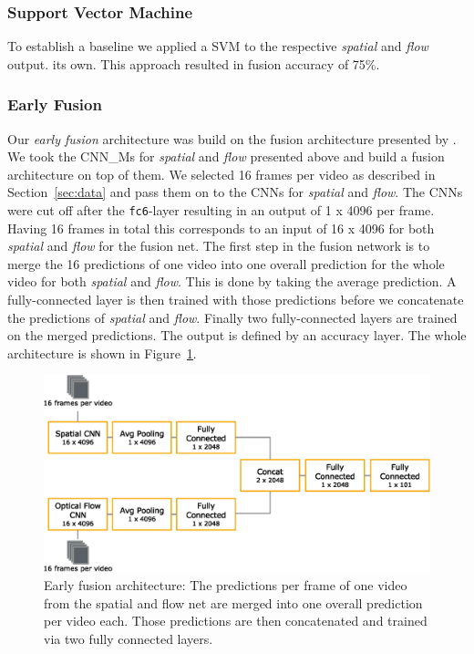 \subsubsection{Support Vector Machine}
To establish a baseline we applied a SVM to the respective \emph{spatial} and \emph{flow} output.
its own.
This approach resulted in fusion accuracy of 75\%.

\subsubsection{Early Fusion}
Our \emph{early fusion} architecture was build on the fusion architecture presented by .
We took the CNN\_Ms for \emph{spatial} and \emph{flow} presented above and build a fusion architecture on top of them.
We selected 16 frames per video as described in Section~\ref{sec:data} and pass them on to the CNNs for \emph{spatial} and \emph{flow}.
The CNNs were cut off after the \texttt{fc6}-layer resulting in an output of 1 x 4096 per frame.
Having 16 frames in total this corresponds to an input of 16 x 4096 for both \emph{spatial} and \emph{flow} for the fusion net.
The first step in the fusion network is to merge the 16 predictions of one video into one overall prediction for the whole video for both \emph{spatial} and \emph{flow}.
This is done by taking the average prediction.
A fully-connected layer is then trained with those predictions before we concatenate the predictions of \emph{spatial} and \emph{flow}.
Finally two fully-connected layers are trained on the merged predictions.
The output is defined by an accuracy layer.
The whole architecture is shown in Figure~\ref{fig:early_fusion}.

\begin{figure}[!htb]
	\centering
	\includegraphics[scale=.7]{images/early_fusion.eps}
	\caption{Early fusion architecture: The predictions per frame of one video from the spatial and flow net are merged into one overall prediction per video each. Those predictions are then concatenated and trained via two fully connected layers.}
	\label{fig:early_fusion}
\end{figure}

